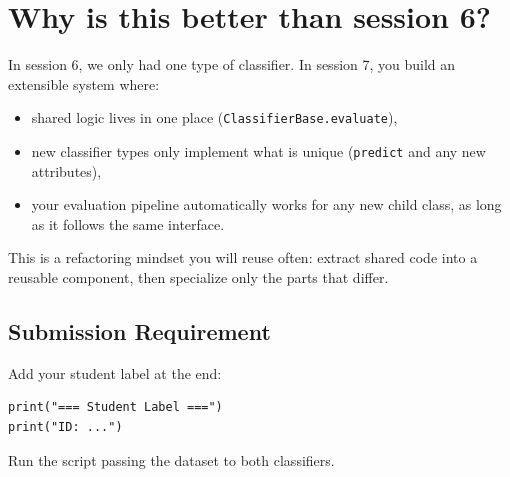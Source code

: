 \section{Why is this better than session 6?}
In session 6, we only had one type of classifier.
In session 7, you build an extensible system where:
\begin{itemize}\setlength{\itemsep}{2pt}
    \item shared logic lives in one place (\texttt{ClassifierBase.evaluate}),
    \item new classifier types only implement what is unique (\texttt{predict} and any new attributes),
    \item your evaluation pipeline automatically works for any new child class, as long as it follows the same interface.
\end{itemize}
\noindent
This is a refactoring mindset you will reuse often: extract shared code into a reusable component, then specialize only the parts that differ.

\subsection{Submission Requirement}
Add your student label at the end:
\begin{verbatim}
print("=== Student Label ===")
print("ID: ...")
\end{verbatim}
Run the script passing the dataset to both classifiers.
